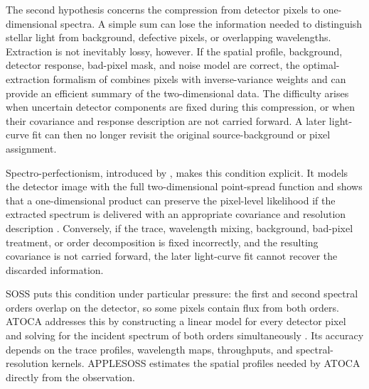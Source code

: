 
The second hypothesis concerns the compression from detector pixels to
one-dimensional spectra. A simple sum can lose the information needed to
distinguish stellar light from background, defective pixels, or overlapping
wavelengths. Extraction is not inevitably lossy, however. If the spatial
profile, background, detector response, bad-pixel mask, and noise model are
correct, the optimal-extraction formalism of \citet{Horne1986} combines pixels
with inverse-variance weights and can provide an efficient summary of the
two-dimensional data. The difficulty arises when uncertain detector components
are fixed during this compression, or when their covariance and response
description are not carried forward. A later light-curve fit can then no
longer revisit the original source-background or pixel assignment.


Spectro-perfectionism, introduced by \citet{BoltonSchlegel2010}, makes this
condition explicit. It models the detector image with the full
two-dimensional point-spread function and shows that a one-dimensional product
can preserve the pixel-level likelihood if the extracted spectrum is delivered
with an appropriate covariance and resolution description
\citep{BoltonEtAl2012}. Conversely, if the trace, wavelength mixing,
background, bad-pixel treatment, or order decomposition is fixed incorrectly,
and the resulting covariance is not carried forward, the later light-curve fit
cannot recover the discarded information.

SOSS puts this condition under particular pressure:
the first and second spectral orders overlap on the detector, so some pixels
contain flux from both orders. ATOCA addresses this by constructing a linear
model for every detector pixel and solving for the incident spectrum of both
orders simultaneously \citep{DarveauBernierEtAl2022}. Its accuracy depends on
the trace profiles, wavelength maps, throughputs, and spectral-resolution
kernels. APPLESOSS \citep{RadicaEtAl2022} estimates the spatial profiles
needed by ATOCA directly from the observation.

